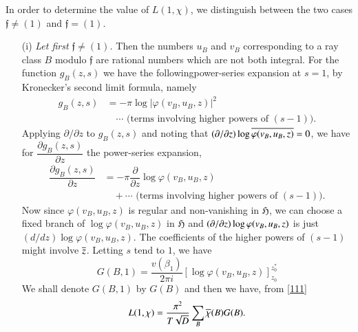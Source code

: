 In order to determine the value of $L(1,\chi)$, we distinguish between
the two cases $\mathfrak{f}\neq (1)$ and $\mathfrak{f}=(1)$.
\begin{itemize}
\item[(i)] {\em Let first $\mathfrak{f}\neq (1)$.} Then the numbers $u_{B}$
and $v_{B}$ corresponding to a ray class $B$ modulo $\mathfrak{f}$ are
rational numbers which are not both integral. For the function
$g_{B}(z,s)$ we have the following\pageoriginale power-series
expansion at $s=1$, by Kronecker's second limit formula, namely
\begin{align*}
g_{B}(z,s) &= -\pi \log|\varphi(v_{B},u_{B},z)|^{2}\\
&\quad \cdots \text{ (terms involving higher powers of } (s-1)).
\end{align*}
Applying $\partial/\partial z$ to $g_{B}(z,s)$ and noting that
$(\partial/\partial z)\log\overline{\varphi(v_{B},u_{B},z)}=0$, we have for
$\dfrac{\partial g_{B}(z,s)}{\partial z}$ the power-series expansion,
\begin{align*}
\dfrac{\partial g_{B}(z,s)}{\partial z} &=
-\pi\dfrac{\partial}{\partial z}\log\varphi(v_{B},u_{B},z)\\
&\quad +\cdots\text{ (terms involving higher powers of } (s-1)).
\end{align*}
Now since $\varphi(v_{B},u_{B},z)$ is regular and non-vanishing in
$\mathfrak{H}$, we can choose a fixed branch of
$\log\varphi(v_{B},u_{B},z)$ in $\mathfrak{H}$ and $(\partial/\partial
z)\log \varphi(v_{B},\break u_{B},z)$ is just
$(d/dz)\log\varphi(v_{B},u_{B},z)$. The coefficients of the higher
powers of $(s-1)$ might involve $\overline{z}$. Letting $s$ tend to $1$, we
have
$$
G(B,1)=\dfrac{v(\beta_{1})}{2\pi
  i}\left[\log\varphi(v_{B},u_{B},z)\right]^{z^{\ast}_{0}}_{z_{0}} 
$$
We shall denote $G(B,1)$ by $G(B)$ and then we have, from \eqref{111}
$$
L(1,\chi)=\dfrac{\pi^{2}}{T\sqrt{D}}\sum_{B}\overline{\chi}(B)G(B).
$$


\end{itemize}
